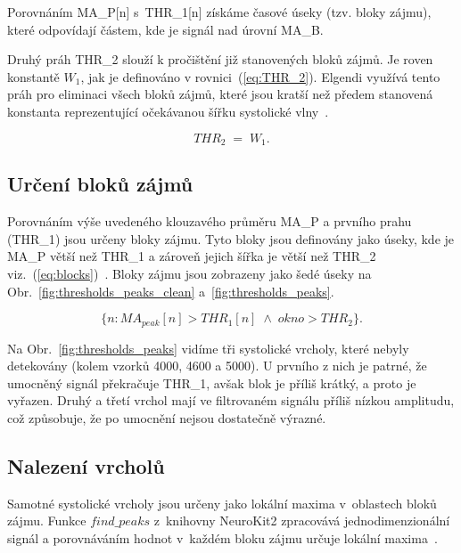 Porovnáním \acs{MA_P}[n] s~\acs{THR_1}[n] získáme časové úseky (tzv. bloky zájmu), které odpovídají částem, kde je signál nad úrovní \acs{MA_B}.

Druhý práh \acs{THR_2} slouží k pročištění již stanovených bloků zájmů.
Je roven konstantě \(W_1\), jak je definováno v rovnici~(\ref{eq:THR_2}).
Elgendi využívá tento práh pro eliminaci všech bloků zájmů, které jsou kratší než předem stanovená konstanta reprezentující očekávanou šířku systolické vlny~\cite{Elgendi2013}.

\begin{equation}
	THR_2 \;=\; W_1.
	\label{eq:THR_2}
\end{equation}

\subsection*{Určení bloků zájmů}
\label{sec:blocks}

Porovnáním výše uvedeného klouzavého průměru \acs{MA_P} a prvního prahu (\acs{THR_1}) jsou určeny bloky zájmu.
Tyto bloky jsou definovány jako úseky, kde je \acs{MA_P} větší než \acs{THR_1} a zároveň jejich šířka je větší než \acs{THR_2} viz.~(\ref{eq:blocks})~\cite{Elgendi2013}.
Bloky zájmu jsou zobrazeny jako šedé úseky na Obr.~\ref{fig:thresholds_peaks_clean} a~\ref{fig:thresholds_peaks}.

\begin{equation}
	\{n : MA_{peak}[n] > THR_1[n] \; \land \; okno > THR_2\}.
	\label{eq:blocks}
\end{equation}

Na Obr.~\ref{fig:thresholds_peaks} vidíme tři systolické vrcholy, které nebyly detekovány (kolem vzorků 4000, 4600 a 5000).
U prvního z nich je patrné, že umocněný signál překračuje \acs{THR_1}, avšak blok je příliš krátký, a proto je vyřazen.
Druhý a třetí vrchol mají ve filtrovaném signálu příliš nízkou amplitudu, což způsobuje, že po umocnění nejsou dostatečně výrazné.

\subsection*{Nalezení vrcholů}
\label{sec:peaks}

Samotné systolické vrcholy jsou určeny jako lokální maxima v~oblastech bloků zájmu.
Funkce \(find\_peaks\) z~knihovny NeuroKit2 zpracovává jednodimenzionální signál a porovnáváním hodnot v~každém bloku zájmu určuje lokální maxima~\cite{NeuroKit2}.

